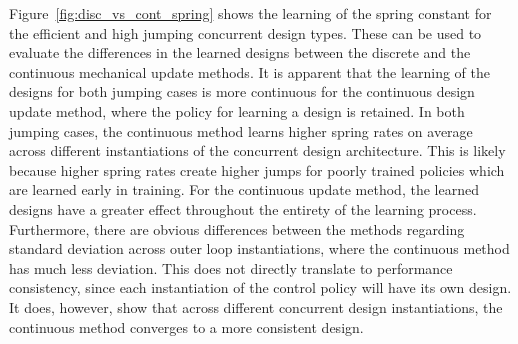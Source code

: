 Figure~\ref{fig:disc_vs_cont_spring} shows the learning of the spring constant for the efficient and high jumping concurrent design types. These can be used to evaluate the differences in the learned designs between the discrete and the continuous mechanical update methods. It is apparent that the learning of the designs for both jumping cases is more continuous for the continuous design update method, where the policy for learning a design is retained. In both jumping cases, the continuous method learns higher spring rates on average across different instantiations of the concurrent design architecture. This is likely because higher spring rates create higher jumps for poorly trained policies which are learned early in training. For the continuous update method, the learned designs have a greater effect throughout the entirety of the learning process. Furthermore, there are obvious differences between the methods regarding standard deviation across outer loop instantiations, where the continuous method has much less deviation. This does not directly translate to performance consistency, since each instantiation of the control policy will have its own design. It does, however, show that across different concurrent design instantiations, the continuous method converges to a more consistent design.

